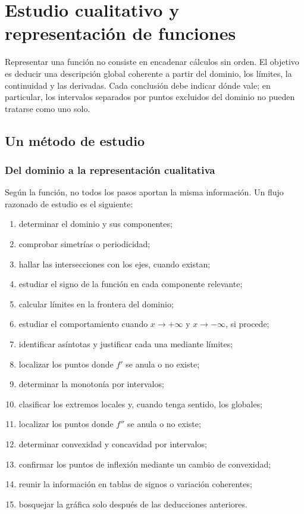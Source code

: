 \chapter[Estudio cualitativo de funciones]{Estudio cualitativo y representación de funciones}
\label{chap:estudio-funciones}

Representar una función no consiste en encadenar cálculos sin orden. El
objetivo es deducir una descripción global coherente a partir del dominio, los
límites, la continuidad y las derivadas. Cada conclusión debe indicar dónde
vale; en particular, los intervalos separados por puntos excluidos del dominio
no pueden tratarse como uno solo.

\section{Un método de estudio}
\label{sec:metodo-estudio-funciones}

\subsection{Del dominio a la representación cualitativa}

Según la función, no todos los pasos aportan la misma información. Un flujo
razonado de estudio es el siguiente:

\begin{enumerate}
  \item determinar el dominio y sus componentes;
  \item comprobar simetrías o periodicidad;
  \item hallar las intersecciones con los ejes, cuando existan;
  \item estudiar el signo de la función en cada componente relevante;
  \item calcular límites en la frontera del dominio;
  \item estudiar el comportamiento cuando \(x\to+\infty\) y
        \(x\to-\infty\), si procede;
  \item identificar asíntotas y justificar cada una mediante límites;
  \item localizar los puntos donde \(f'\) se anula o no existe;
  \item determinar la monotonía por intervalos;
  \item clasificar los extremos locales y, cuando tenga sentido, los globales;
  \item localizar los puntos donde \(f''\) se anula o no existe;
  \item determinar convexidad y concavidad por intervalos;
  \item confirmar los puntos de inflexión mediante un cambio de convexidad;
  \item reunir la información en tablas de signos o variación coherentes;
  \item bosquejar la gráfica solo después de las deducciones anteriores.
\end{enumerate}

